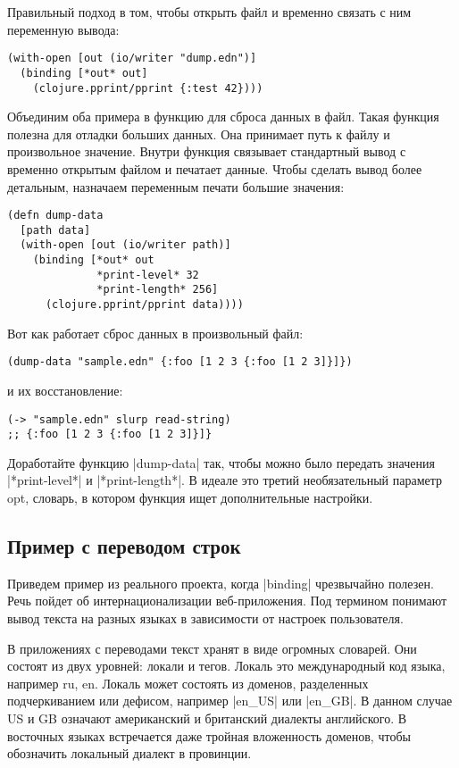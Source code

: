 Правильный подход в том, чтобы открыть файл и временно связать с ним переменную
вывода:

\begin{verbatim}
(with-open [out (io/writer "dump.edn")]
  (binding [*out* out]
    (clojure.pprint/pprint {:test 42})))
\end{verbatim}

Объединим оба примера в функцию для сброса данных в файл. Такая функция полезна
для отладки больших данных. Она принимает путь к файлу и произвольное
значение. Внутри функция связывает стандартный вывод с временно открытым файлом
и печатает данные. Чтобы сделать вывод более детальным, назначаем переменным
печати большие значения:

\begin{verbatim}
(defn dump-data
  [path data]
  (with-open [out (io/writer path)]
    (binding [*out* out
              *print-level* 32
              *print-length* 256]
      (clojure.pprint/pprint data))))
\end{verbatim}

Вот как работает сброс данных в произвольный файл:

\begin{verbatim}
(dump-data "sample.edn" {:foo [1 2 3 {:foo [1 2 3]}]})
\end{verbatim}

и их восстановление:

\begin{verbatim}
(-> "sample.edn" slurp read-string)
;; {:foo [1 2 3 {:foo [1 2 3]}]}
\end{verbatim}

Доработайте функцию \spverb|dump-data| так, чтобы можно было передать значения
\spverb|*print-level*| и \spverb|*print-length*|. В идеале это третий необязательный параметр
opt, словарь, в котором функция ищет дополнительные настройки.

\subsection{Пример с переводом строк}

Приведем пример из реального проекта, когда \spverb|binding| чрезвычайно полезен. Речь
пойдет об интернационализации веб-приложения. Под термином понимают вывод текста
на разных языках в зависимости от настроек пользователя.

В приложениях с переводами текст хранят в виде огромных словарей. Они состоят из
двух уровней: локали и тегов. Локаль это международный код языка, например ru,
en. Локаль может состоять из доменов, разделенных подчеркиванием или дефисом,
например \spverb|en_US| или \spverb|en_GB|. В данном случае US и GB означают американский и
британский диалекты английского. В восточных языках встречается даже тройная
вложенность доменов, чтобы обозначить локальный диалект в провинции.

